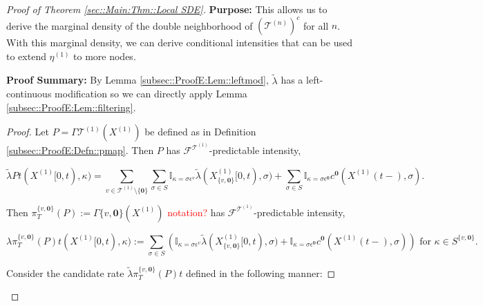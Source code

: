 \documentclass[12pt]{article}
\newcommand{\mb}{\mathbb}
\newcommand{\mc}{\mathcal}
\newcommand{\te}{\text}
\newcommand{\ep}{\epsilon}
\newcommand{\tr}{\textcolor{red}}
\newcommand{\purpose}{\textbf{Purpose: }}
\newcommand{\pfsum}{\textbf{Proof Summary: }}
\newcommand{\defeq}{:=}								%
\renewcommand{\root}{\mathbf{0}}				%
\renewcommand{\v}{v}							%
\renewcommand{\S}{S}							%
\newcommand{\s}{\sigma}							%
\newcommand{\ev}{\ep}							%
\newcommand{\T}{T}								%
\renewcommand{\t}{t}							%
\newcommand{\proj}{\pi}							%
\newcommand{\F}{\mc{F}}							%
\newcommand{\X}{X}								%
\newcommand{\IGr}{c}							%
\newcommand{\vind}[1]{^{#1}}					%
\newcommand{\carp}[1]{^{#1}}					%
\newcommand{\vsi}[1]{^{#1}}						%
\newcommand{\cind}[1]{_{#1}}					%
\newcommand{\tp}[1]{(#1)}						%
\newcommand{\tip}[1]{#1}						%
\newcommand{\ts}[1]{_{#1}}						%
\newcommand{\tree}{\mc{T}}						%
\newcommand{\sln}[1]{^{(#1)}}						%
\newcommand{\rate}{\lambda}						%
\newcommand{\alt}[1]{\widetilde{#1}}			%
\newcommand{\mmm}{\eta}							%
\newcommand{\pmap}{\Gamma}						%
\renewcommand{\mark}{\kappa}					%
\newcommand{\rp}{P}								%
\newcommand{\crate}{\alt{\lambda}}				%
\begin{document}
\begin{proof}[Proof of Theorem \ref{sec::Main:Thm::Local SDE}]
\purpose This allows us to derive the marginal density of the double neighborhood of \((\tree\sln{n})^c\) for all \(n\). With this marginal density, we can derive conditional intensities that can be used to extend \(\mmm\sln{1}\ts{}\) to more nodes.

\pfsum By Lemma \ref{subsec::ProofE:Lem::leftmod}, \(\crate{}{}\) has a left-continuous modification so we can directly apply Lemma \ref{subsec::ProofE:Lem::filtering}.

\begin{proof}
Let \(\rp{} = \pmap{\tree\sln{1}}(\X\sln{1}\cind{}\tip{})\) be defined as in Definition \ref{subsec::ProofE:Defn::pmap}. Then \(\rp{}\) has \(\F\vsi{\tree\sln{1}}\ts{}\)-predictable intensity,

\[\crate{\rp{}}{\t}(\X\sln{1}\cind{}\tip{[0,\t)},\mark{}) = \sum_{\v\in \tree\sln{1}\setminus\{\root\}}\sum_{\s\in \S} \mb{I}_{\mark{} = \s\ev\vind{\v}}\crate{}{}(\X\sln{1}\cind{\{\v,\root\}}\tip{[0,\t)},\s) + \sum_{\s\in\S}\mb{I}_{\mark{} = \s\ev\vind{\root}}\IGr\vind{\root}(\X\sln{1}\cind{}\tp{\t-},\s).\]

Then \(\proj\vsi{\{\v,\root\}}\ts{\T}(\rp{})\defeq \pmap{\{\v,\root\}}(\X\sln{1}\cind{}\tip{})\) \tr{notation?} has \(\F\vsi{\tree\sln{1}}\ts{}\)-predictable intensity,

\[\rate{\proj\vsi{\{\v,\root\}}\ts{\T}(\rp{})}{\t}(\X\sln{1}\cind{}\tip{[0,\t)},\mark{}) \defeq \sum_{\s\in \S} \left(\mb{I}_{\mark{} = \s\ev\vind{\v}}\crate{}{}(\X\sln{1}\cind{\{\v,\root\}}\tip{[0,\t)},\s) + \mb{I}_{\mark{} = \s\ev\vind{\root}}\IGr\vind{\root}(\X\sln{1}\cind{}\tp{\t-},\s)\right)\te{ for } \kappa \in \S\carp{\{\v,\root\}}.\]

Consider the candidate rate \(\crate{\proj\vsi{\{\v,\root\}}\ts{\T}(\rp{})}{\t}\) defined in the following manner:


\end{proof}
\end{proof}
\end{document}
